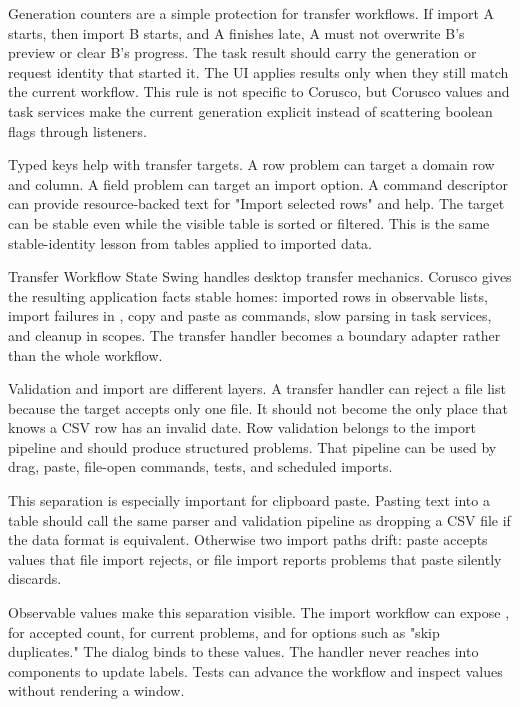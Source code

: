 Generation counters are a simple protection for transfer workflows. If import A starts, then import B starts, and A finishes late, A must not overwrite B's preview or clear B's progress. The task result should carry the generation or request identity that started it. The UI applies results only when they still match the current workflow. This rule is not specific to Corusco, but Corusco values and task services make the current generation explicit instead of scattering boolean flags through listeners.

Typed keys help with transfer targets. A row problem can target a domain row and column. A field problem can target an import option. A command descriptor can provide resource-backed text for "Import selected rows" and help. The target can be stable even while the visible table is sorted or filtered. This is the same stable-identity lesson from tables applied to imported data.

\begin{coruscobox}{Transfer Workflow State}
Swing handles desktop transfer mechanics. Corusco gives the resulting application facts stable homes: imported rows in observable lists, import failures in , copy and paste as commands, slow parsing in task services, and cleanup in scopes. The transfer handler becomes a boundary adapter rather than the whole workflow.
\end{coruscobox}

Validation and import are different layers. A transfer handler can reject a file list because the target accepts only one file. It should not become the only place that knows a CSV row has an invalid date. Row validation belongs to the import pipeline and should produce structured problems. That pipeline can be used by drag, paste, file-open commands, tests, and scheduled imports.

This separation is especially important for clipboard paste. Pasting text into a table should call the same parser and validation pipeline as dropping a CSV file if the data format is equivalent. Otherwise two import paths drift: paste accepts values that file import rejects, or file import reports problems that paste silently discards.

Observable values make this separation visible. The import workflow can expose ,  for accepted count,  for current problems, and  for options such as "skip duplicates." The dialog binds to these values. The handler never reaches into components to update labels. Tests can advance the workflow and inspect values without rendering a window.

